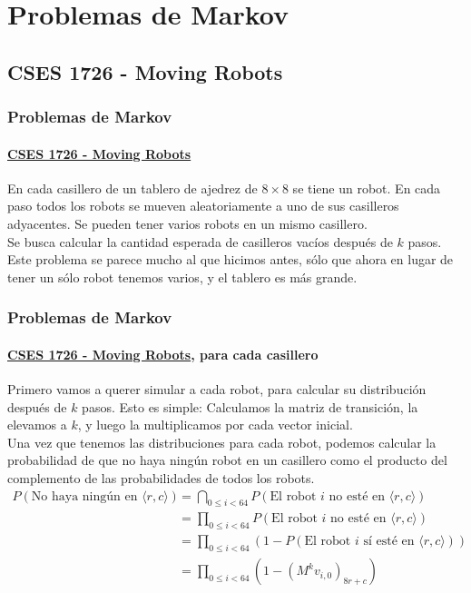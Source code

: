 \documentclass[../main.tex]{subfiles}
\begin{document}
\newcommand{\SECTIOND}{Problemas de Markov}
\section{\SECTIOND}

\newcommand{\EJD}{\href{https://cses.fi/problemset/view/1726/}{CSES 1726 - Moving Robots}}
\subsection{CSES 1726 - Moving Robots}

\begin{frame}
  \frametitle{\SECTIOND}
  \framesubtitle{\EJD}

  En cada casillero de un tablero de ajedrez de \(8 \times 8\) se tiene un robot. En cada paso todos los robots se mueven aleatoriamente a uno de sus casilleros adyacentes. Se pueden tener varios robots en un mismo casillero. \\
  Se busca calcular la cantidad esperada de casilleros vacíos después de \(k\) pasos. \pause \\
  Este problema se parece mucho al que hicimos antes, sólo que ahora en lugar de tener un sólo robot tenemos varios, y el tablero es más grande.
\end{frame}

\begin{frame}
  \frametitle{\SECTIOND}
  \framesubtitle{\EJD, para cada casillero}

  Primero vamos a querer simular a cada robot, para calcular su distribución después de \(k\) pasos. \pause Esto es simple: Calculamos la matriz de transición, la elevamos a \(k\), y luego la multiplicamos por cada vector inicial. \pause \\
  Una vez que tenemos las distribuciones para cada robot, podemos calcular la probabilidad de que no haya ningún robot en un casillero como el producto del complemento de las probabilidades de todos los robots. \pause
  \begin{align*}
    P(\text{No haya ningún en } \langle r, c \rangle) &= \bigcap_{0 \leq i < 64} P(\text{El robot } i \text{ no esté en } \langle r, c \rangle) \\
                                                      &= \prod_{0 \leq i < 64}P(\text{El robot } i \text{ no esté en } \langle r, c \rangle) \\
                                                      &= \prod_{0 \leq i < 64}(1 - P(\text{El robot } i \text{ sí esté en } \langle r, c \rangle)) \\
                                                      &= \prod_{0 \leq i < 64}(1 - (M^{k}v_{i,0})_{8r + c}) \\
  \end{align*}
\end{frame}
\end{document}
